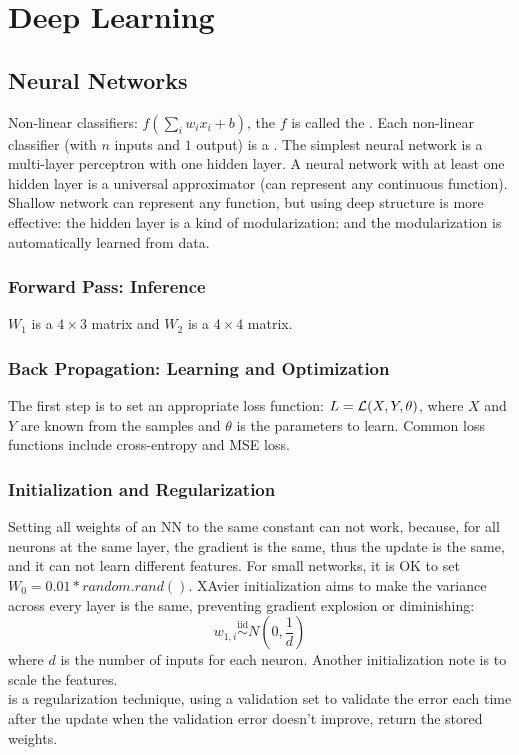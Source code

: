 \documentclass[12pt]{report}
\begin{document}
\clearpage
\section{Deep Learning}

\subsection{Neural Networks}
Non-linear classifiers: $f(\sum_i w_ix_i+b)$, the $f$ is called the . Each non-linear classifier 
(with $n$ inputs and $1$ output) is a .
The simplest neural network is a multi-layer perceptron with one hidden layer. A neural network with at least one hidden layer is a universal approximator
(can represent any continuous function). Shallow network can represent any function, but using deep structure is more effective: the hidden layer is a kind of 
modularization: and the modularization is automatically learned from data.

\subsubsection{Forward Pass: Inference}
$W_1$ is a $4\times 3$ matrix and $W_2$ is a $4\times 4$ matrix.
\subsubsection{Back Propagation: Learning and Optimization}
The first step is to set an appropriate loss function: $L=\mathcal{L}(X,Y,\theta)$, where $X$ and $Y$ are known from the samples and $\theta$ is the parameters to learn. 
Common loss functions include cross-entropy and MSE loss.
\subsubsection{Initialization and Regularization}
Setting all weights of an NN to the same constant can not work, because, for all neurons at the same layer, the gradient is the same, thus the update is the same, and it can not 
learn different features. For small networks, it is OK to set $W_0=0.01*random.rand()$. XAvier initialization aims to make the variance across every layer is the same, 
preventing gradient explosion or diminishing:
\[w_{1,i}\overset{\mathrm{iid}}{\operatorname*{\sim}}N\left(0,\frac1d\right)\]
where $d$ is the number of inputs for each neuron. Another initialization note is to scale the features.\\
 is a regularization technique, using a validation set to validate the error each time after the update when the validation error 
doesn't improve, return the stored weights.
\end{document}
